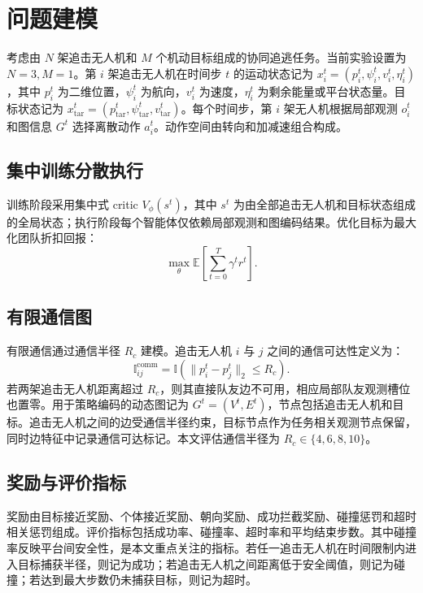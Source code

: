\section{问题建模}

考虑由 $N$ 架追击无人机和 $M$ 个机动目标组成的协同追逃任务。当前实验设置为 $N=3, M=1$。第 $i$ 架追击无人机在时间步 $t$ 的运动状态记为 $x_i^t=(p_i^t,\psi_i^t,v_i^t,\eta_i^t)$，其中 $p_i^t$ 为二维位置，$\psi_i^t$ 为航向，$v_i^t$ 为速度，$\eta_i^t$ 为剩余能量或平台状态量。目标状态记为 $x_{\mathrm{tar}}^t=(p_{\mathrm{tar}}^t,\psi_{\mathrm{tar}}^t,v_{\mathrm{tar}}^t)$。每个时间步，第 $i$ 架无人机根据局部观测 $o_i^t$ 和图信息 $G^t$ 选择离散动作 $a_i^t$。动作空间由转向和加减速组合构成。

\subsection{集中训练分散执行}

训练阶段采用集中式 critic $V_\phi(s^t)$，其中 $s^t$ 为由全部追击无人机和目标状态组成的全局状态；执行阶段每个智能体仅依赖局部观测和图编码结果。优化目标为最大化团队折扣回报：
\begin{equation}
\max_\theta \mathbb{E}\left[\sum_{t=0}^{T}\gamma^t r^t\right].
\end{equation}

\subsection{有限通信图}

有限通信通过通信半径 $R_c$ 建模。追击无人机 $i$ 与 $j$ 之间的通信可达性定义为：
\begin{equation}
\mathbb{I}_{ij}^{\mathrm{comm}}=\mathbb{I}\left(\|p_i^t-p_j^t\|_2\leq R_c\right).
\end{equation}
若两架追击无人机距离超过 $R_c$，则其直接队友边不可用，相应局部队友观测槽位也置零。用于策略编码的动态图记为 $G^t=(V^t,E^t)$，节点包括追击无人机和目标。追击无人机之间的边受通信半径约束，目标节点作为任务相关观测节点保留，同时边特征中记录通信可达标记。本文评估通信半径为 $R_c\in\{4,6,8,10\}$。

\subsection{奖励与评价指标}

奖励由目标接近奖励、个体接近奖励、朝向奖励、成功拦截奖励、碰撞惩罚和超时相关惩罚组成。评价指标包括成功率、碰撞率、超时率和平均结束步数。其中碰撞率反映平台间安全性，是本文重点关注的指标。若任一追击无人机在时间限制内进入目标捕获半径，则记为成功；若追击无人机之间距离低于安全阈值，则记为碰撞；若达到最大步数仍未捕获目标，则记为超时。

